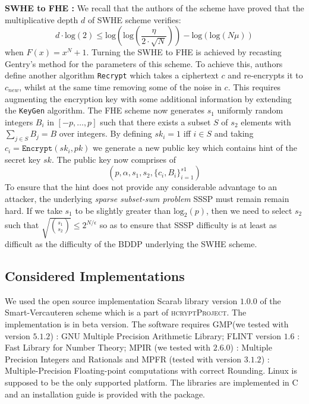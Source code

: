 \documentclass{acm_proc_article-sp}
\begin{document}
\textbf{SWHE to FHE :} We recall that the authors of the scheme have proved that the multiplicative depth $d$ of SWHE scheme verifies: \begin{equation}d \cdot \mathrm{log}(2) \leq  \mathrm{log}\left( \mathrm{log}\left(\frac{\eta}{2\cdot \sqrt{N}}\right) \right) - \mathrm{log}\left(\mathrm{log}\left( N\mu\right)\right)\end{equation}
when $F(x)= x^N+1$. Turning the SWHE to FHE is achieved by recasting Gentry's method for the parameters of this scheme. To achieve this, authors define another algorithm \texttt{Recrypt} which takes a ciphertext $c$ and re-encrypts it to $c_{new}$, whilst at the same time removing some of the noise in $c$. This requires augmenting the encryption key with some additional information by extending the \texttt{KeyGen} algorithm. The FHE scheme now generates $s_1$ uniformly random integers $B_i$ in $[-p, \ldots, p]$ such that there exists a subset $S$ of $s_2$ elements with $\sum_{j \in S}{B_j}= B$ over integers. By defining $sk_i =1$ iff $i\in S$ and taking $c_i=\texttt{Encrypt}(sk_i,pk)$ we generate a new public key which contains hint of the secret key $sk$. The public key now comprises of \[(p, \alpha, s_1, s_2, \{c_i, B_i\}_{i=1}^{s1})\]
To ensure that the hint does not provide any considerable advantage to an attacker, the underlying \textit{sparse subset-sum problem} SSSP must remain remain hard. If we take $s_1$ to be slightly greater than $\mathrm{log}_{2}(p)$, then we need to select $s_2$ such that $\sqrt {{s_1}  \choose {s_2} } \leq 2 ^{N/\epsilon}$ so as to ensure that SSSP difficulty is at least as difficult as the difficulty of the BDDP underlying the SWHE scheme. 

\subsection{Considered Implementations}
We used the open source implementation Scarab library \cite{hcrypt}  version $1.0.0$ of the Smart-Vercauteren scheme which is a part of \textsc{hcryptProject}. The implementation is in beta version. The software requires GMP(we tested with version $5.1.2$) \cite{gmp} : GNU Multiple Precision Arithmetic Library; FLINT version $1.6$ \cite{flint}: Fast Library for Number Theory; MPIR (we tested with $2.6.0$) \cite{mpir} : Multiple Precision Integers and Rationals and MPFR (tested with version $3.1.2$) \cite{mpfr} :  Multiple-Precision Floating-point computations with correct Rounding. Linux is supposed to be the only supported platform. The libraries are implemented in  C and an installation guide is provided with the package. 
\end{document}
